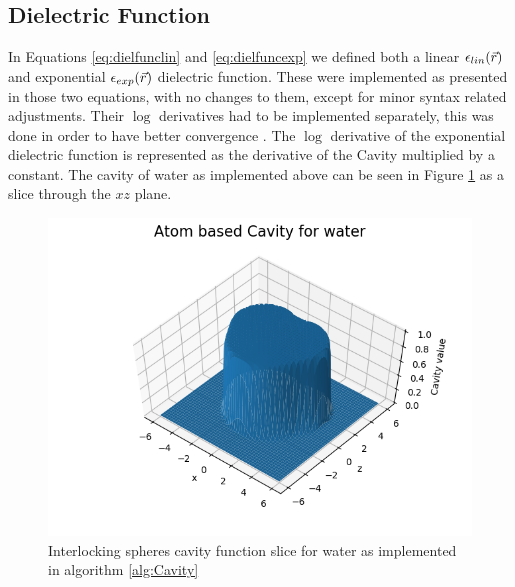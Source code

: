 \documentclass[../master_thesis.tex]{subfiles}
\begin{document}
\subsection{Dielectric Function}
In Equations \ref{eq:dielfunclin} and \ref{eq:dielfuncexp} we defined both a
linear $\epsilon_{lin}(\vec{r})$ and exponential $\epsilon_{exp}(\vec{r})$ dielectric function. These were implemented as presented
in those two equations, with no changes to them, except for minor syntax related
adjustments. Their $\log$ derivatives had to be implemented separately,
this was done in order to have better convergence \cite{FossoTande:2013ka}. The
$\log$ derivative of the exponential dielectric function is represented as the
derivative of the Cavity multiplied by a constant. The cavity of water as implemented
above can be seen in Figure \ref{fig:watcav} as a slice through the $xz$ plane.

\begin{figure}[ht]
  \includegraphics[width=\linewidth]{img/Figure_1-1.png}
  \caption[Interlocking spheres cavity for water]{Interlocking spheres cavity function slice for water as implemented in algorithm \ref{alg:Cavity}}
  \label{fig:watcav}
\end{figure}
\clearpage
\end{document}
